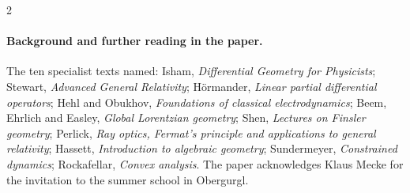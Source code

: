 \begin{paracol}{2}
\paragraph{Background and further reading in the paper.} The ten specialist texts named: Isham, \emph{Differential Geometry for Physicists}; Stewart, \emph{Advanced General Relativity}; H\"ormander, \emph{Linear partial differential operators}; Hehl and Obukhov, \emph{Foundations of classical electrodynamics}; Beem, Ehrlich and Easley, \emph{Global Lorentzian geometry}; Shen, \emph{Lectures on Finsler geometry}; Perlick, \emph{Ray optics, Fermat's principle and applications to general relativity}; Hassett, \emph{Introduction to algebraic geometry}; Sundermeyer, \emph{Constrained dynamics}; Rockafellar, \emph{Convex analysis}. The paper acknowledges Klaus Mecke for the invitation to the summer school in Obergurgl.


\end{paracol}
